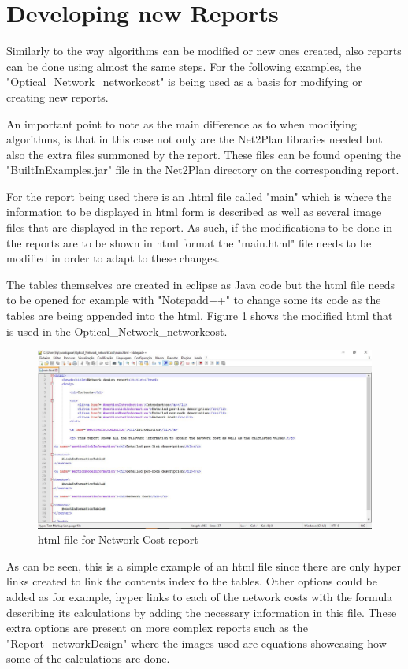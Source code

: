 	\newpage

	\section*{Developing new Reports}
	Similarly to the way algorithms can be modified or new ones created, also reports can be done using almost the same steps. For the following examples, the "Optical\_Network\_networkcost" is being used as a basis for modifying or creating new reports.

	An important point to note as the main difference as to when modifying algorithms, is that in this case not only are the Net2Plan libraries needed but also the extra files summoned by the report. These files can be found opening the "BuiltInExamples.jar" file in the Net2Plan directory on the corresponding report.

	For the report being used there is an .html file called "main" which is where the information to be displayed in html form is described as well as several image files that are displayed in the report. As such, if the modifications to be done in the reports are to be shown in html format the "main.html" file needs to be modified in order to adapt to these changes.
	
	The tables themselves are created in eclipse as Java code but the html file needs to be opened for example with "Notepadd++" to change some its code as the tables are being appended into the html. Figure \ref{html_report} shows the modified html that is used in the Optical\_Network\_networkcost.
	
	\begin{figure}[h!]
		\centering
		\includegraphics[width = 17cm]{html_report.pdf}
		\caption{html file for Network Cost report}
		\label{html_report}
	\end{figure}	
		
	As can be seen, this is a simple example of an html file since there are only hyper links created to link the contents index to the tables. Other options could be added as for example, hyper links to each of the network costs with the formula describing its calculations by adding the necessary information in this file. These extra options are present on more complex reports such as the "Report\_networkDesign" where the images used are equations showcasing how some of the calculations are done.
	
\clearpage
